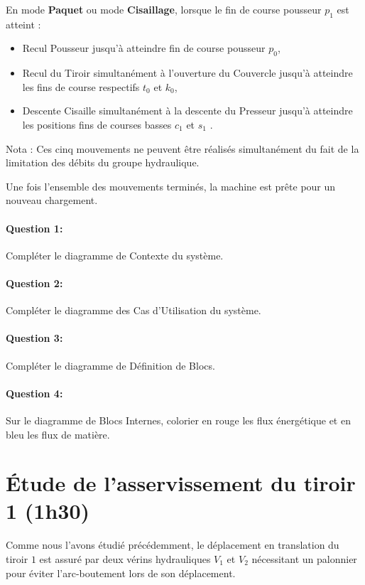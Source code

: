En mode \textbf{Paquet} ou mode \textbf{Cisaillage}, lorsque le fin de course pousseur $p_1$ est atteint :
\begin{itemize}
 \item Recul \og Pousseur \fg jusqu'à atteindre fin de course pousseur $p_0$,
 \item Recul du \og Tiroir \fg simultanément à l'ouverture du \og Couvercle \fg jusqu'à atteindre les fins de course respectifs $t_0$ et $k_0$,
 \item Descente \og Cisaille \fg simultanément à la descente du \og Presseur \fg jusqu'à atteindre les positions fins de courses basses $c_1$ et $s_1$	.
\end{itemize}

Nota : Ces cinq mouvements ne peuvent être réalisés simultanément du fait de la limitation des débits du groupe hydraulique.

Une fois l'ensemble des mouvements terminés, la machine est prête pour un nouveau chargement.

\paragraph{Question 1:} Compléter le diagramme de Contexte du système.

\paragraph{Question 2:} Compléter le diagramme des Cas d'Utilisation du système.

\paragraph{Question 3:} Compléter le diagramme de Définition de Blocs.

\paragraph{Question 4:} Sur le diagramme de Blocs Internes, colorier en rouge les flux énergétique et en bleu les flux de matière.

\section{Étude de l'asservissement du tiroir 1 (1h30)}

Comme nous l'avons étudié précédemment, le déplacement en translation du tiroir $1$ est assuré par deux vérins hydrauliques $V_1$ et $V_2$ nécessitant un palonnier pour éviter l'arc-boutement lors de son déplacement.

